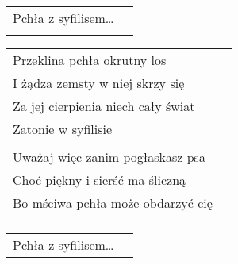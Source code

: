 \documentclass[a5paper]{article}
\begin{document}
\noindent
\begin{tabular}{@{}p{8.5cm}p{3cm}@{}}
Pchła z syfilisem… \\ \\
\end{tabular}

\noindent
\begin{tabular}{@{}p{8.5cm}p{3cm}@{}}
Przeklina pchła okrutny los \\
I żądza zemsty w niej skrzy się \\
Za jej cierpienia niech cały świat \\
Zatonie w syfilisie \\ \\

Uważaj więc zanim pogłaskasz psa \\
Choć piękny i sierść ma śliczną \\
Bo mściwa pchła może obdarzyć cię \\ \\
\end{tabular}

\noindent
\begin{tabular}{@{}p{8.5cm}p{3cm}@{}}
Pchła z syfilisem…
\end{tabular}
\end{document}
